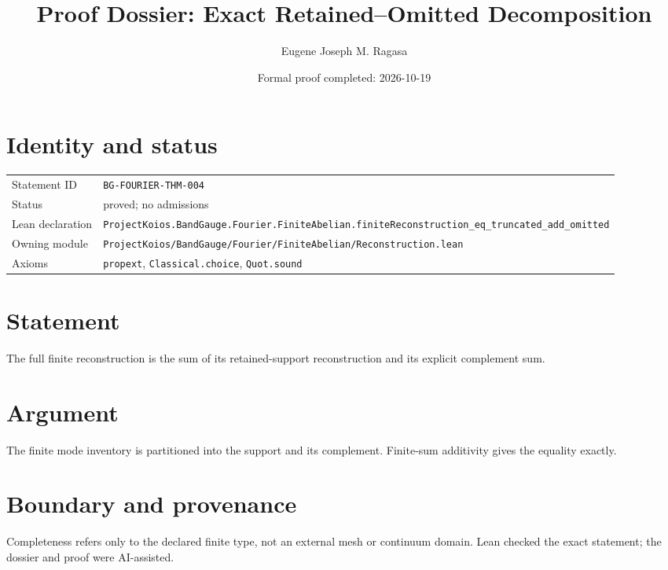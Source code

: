 \documentclass[11pt]{article}
\title{Proof Dossier: Exact Retained--Omitted Decomposition}
\author{Eugene Joseph M. Ragasa}
\date{Formal proof completed: 2026-10-19}
\begin{document}
\maketitle
\section{Identity and status}
\begin{tabularx}{\textwidth}{@{}lX@{}}\toprule
Statement ID & \texttt{BG-FOURIER-THM-004} \\
Status & proved; no admissions \\
Lean declaration & \texttt{ProjectKoios.BandGauge.Fourier.FiniteAbelian.}\newline\texttt{finiteReconstruction\_eq\_truncated\_add\_omitted} \\
Owning module & \texttt{ProjectKoios/BandGauge/Fourier/FiniteAbelian/Reconstruction.lean} \\
Axioms & \texttt{propext}, \texttt{Classical.choice}, \texttt{Quot.sound} \\
\bottomrule\end{tabularx}
\section{Statement}
The full finite reconstruction is the sum of its retained-support reconstruction and its explicit complement sum.
\section{Argument}
The finite mode inventory is partitioned into the support and its complement. Finite-sum additivity gives the equality exactly.
\section{Boundary and provenance}
Completeness refers only to the declared finite type, not an external mesh or continuum domain. Lean checked the exact statement; the dossier and proof were AI-assisted.
\end{document}
